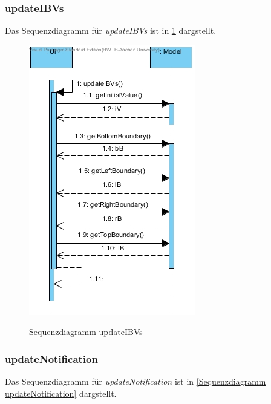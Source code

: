 \subsubsection*{updateIBVs}

Das Sequenzdiagramm für \emph{updateIBVs} ist in \ref{Sequenzdiagramm updateIBVs} dargstellt.

\begin{figure}[H]
	\centering
	\includegraphics[scale=.6]{Bilder/Ui__updateIBVs().jpg}\\
	\caption{Sequenzdiagramm updateIBVs}
	\label{Sequenzdiagramm updateIBVs}
\end{figure}

\subsubsection*{updateNotification}

Das Sequenzdiagramm für \emph{updateNotification} ist in \ref{Sequenzdiagramm updateNotification} dargstellt.

